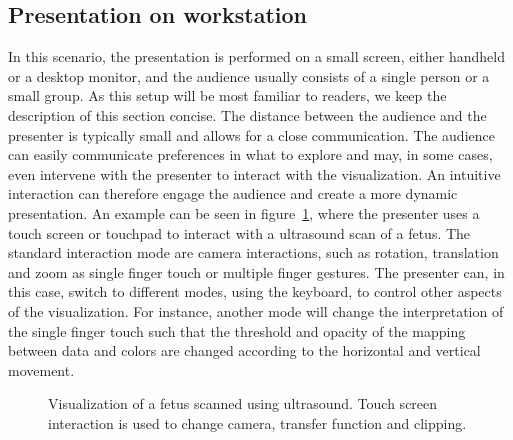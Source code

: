 \documentclass[review,journal]{vgtc}         %
\begin{document}
\subsection{Presentation on workstation} \label{sec:workstation}
In this scenario, the presentation is performed on a small screen, either handheld or a desktop monitor, and the audience usually consists of a single person or a small group.
As this setup will be most familiar to readers, we keep the description of this section concise.
The distance between the audience and the presenter is typically small and allows for a close communication.
The audience can easily communicate preferences in what to explore and may, in some cases, even intervene with the presenter to interact with the visualization.
An intuitive interaction can therefore engage the audience and create a more dynamic presentation.
An example can be seen in figure~\ref{img:touch_workstation}, where the presenter uses a touch screen or touchpad to interact with a ultrasound scan of a fetus.
The standard interaction mode are camera interactions, such as rotation, translation and zoom as single finger touch or multiple finger gestures.
The presenter can, in this case, switch to different modes, using the keyboard, to control other aspects of the visualization.
For instance, another mode will change the interpretation of the single finger touch such that the threshold and opacity of the mapping between data and colors are changed according to the horizontal and vertical movement.

%
%
%
%

\begin{figure}
	\centering
	\caption{Visualization of a fetus scanned using ultrasound. Touch screen interaction is used to change camera, transfer function and clipping.}
	\label{img:touch_workstation}
\end{figure}
\end{document}
